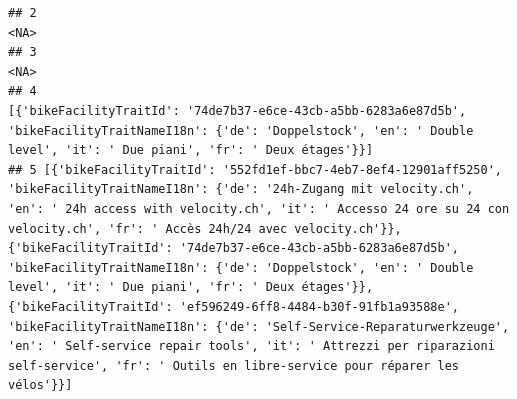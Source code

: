 \documentclass[
]{book}
\begin{document}
\begin{verbatim}
## 2                                                                                                                                                                                                                                                                                                                                                                                                                                                                                                                                                                                                                                                                                                                                          <NA>
## 3                                                                                                                                                                                                                                                                                                                                                                                                                                                                                                                                                                                                                                                                                                                                          <NA>
## 4                                                                                                                                                                                                                                                                                                                                                                                                                                                                                                                                                        [{'bikeFacilityTraitId': '74de7b37-e6ce-43cb-a5bb-6283a6e87d5b', 'bikeFacilityTraitNameI18n': {'de': 'Doppelstock', 'en': ' Double level', 'it': ' Due piani', 'fr': ' Deux étages'}}]
## 5 [{'bikeFacilityTraitId': '552fd1ef-bbc7-4eb7-8ef4-12901aff5250', 'bikeFacilityTraitNameI18n': {'de': '24h-Zugang mit velocity.ch', 'en': ' 24h access with velocity.ch', 'it': ' Accesso 24 ore su 24 con velocity.ch', 'fr': ' Accès 24h/24 avec velocity.ch'}}, {'bikeFacilityTraitId': '74de7b37-e6ce-43cb-a5bb-6283a6e87d5b', 'bikeFacilityTraitNameI18n': {'de': 'Doppelstock', 'en': ' Double level', 'it': ' Due piani', 'fr': ' Deux étages'}}, {'bikeFacilityTraitId': 'ef596249-6ff8-4484-b30f-91fb1a93588e', 'bikeFacilityTraitNameI18n': {'de': 'Self-Service-Reparaturwerkzeuge', 'en': ' Self-service repair tools', 'it': ' Attrezzi per riparazioni self-service', 'fr': ' Outils en libre-service pour réparer les vélos'}}]

\end{verbatim}
\end{document}
